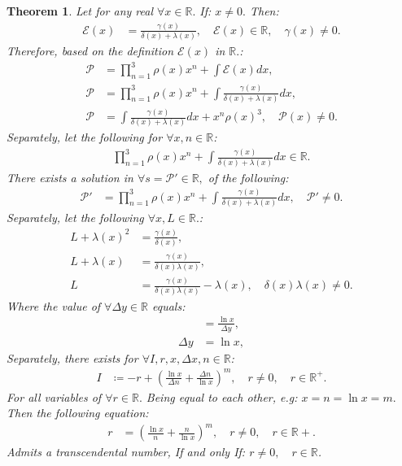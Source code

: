 \documentclass[10pt]{article}
\theoremstyle{plain}
\newtheorem{theorem}{Theorem}[section]
\theoremstyle{definition}
\theoremstyle{remark}
\begin{document}
\begin{theorem}
	Let for any real $\forall x \in \mathbb{R}.$ If: $x \neq 0.$ Then:
	\begin{align*}
		\mathcal{E}(x) &= \frac{\gamma(x)}{\delta(x) + \lambda(x)}, \quad \mathcal{E}(x) \in \mathbb{R}, \quad \gamma(x) \neq 0.
	\end{align*}
	Therefore, based on the definition $\mathcal{E}(x)$ in $\mathbb{R}.$:
	\begin{align*}
		\mathcal{P} &= \prod_{n=1}^{3}\rho(x) x^{n} + \int \mathcal{E}(x) dx,\\
		\mathcal{P} &= \prod_{n=1}^{3}\rho(x) x^{n} + \int \frac{\gamma(x)}{\delta(x) + \lambda(x)} dx,\\
		\mathcal{P} &= \int \frac{\gamma(x)}{\delta(x) + \lambda(x)} dx + x^{n} \rho(x)^{3}, \quad \mathcal{P}(x) \neq 0.
	\end{align*}
	Separately, let the following for $\forall x, n \in \mathbb{R}$:
	\begin{align*}
		\prod_{n=1}^{3}\rho(x) x^{n} + \int \frac{\gamma(x)}{\delta(x) + \lambda(x)} dx \in \mathbb{R}.
	\end{align*}
	There exists a solution in $\forall s = \mathcal{P}' \in \mathbb{R},$ of the following:
	\begin{align*}
		\mathcal{P}' &= \prod_{n=1}^{3}\rho(x) x^{n} + \int \frac{\gamma(x)}{\delta(x) + \lambda(x)} dx, \quad \mathcal{P}' \neq 0.
	\end{align*}
	Separately, let the following $\forall x, L \in \mathbb{R}.$:
	\begin{align*}
		L + \lambda(x)^{2} &= \frac{\gamma(x)}{\delta(x)},\\
	 	L + \lambda(x) &= \frac{\gamma(x)}{\delta(x)  \lambda(x) },\\
	 	L &= \frac{\gamma(x)}{\delta(x)  \lambda(x) } - \lambda(x), \quad \delta(x)\lambda(x) \neq 0.
	\end{align*}
	Where the value of $\forall \Delta y \in \mathbb{R}$ equals:
	\begin{align*}
		&= \frac{\ln x}{\Delta y},\\
		\Delta y &= \ln x,
	\end{align*}
	Separately, there exists for $\forall I, r, x, \Delta x, n \in \mathbb{R}$:
	\begin{align*}
		I &\coloneq -r + ( \frac{\ln x}{\Delta n} + \frac{\Delta n}{\ln x})^m, \quad r \neq 0, \quad r \in \mathbb{R}^{+}.
	\end{align*}
	For all variables of $\forall r \in \mathbb{R}.$ Being equal to each other, e.g: $x = n = \ln x = m.$ Then the following equation:
	\begin{align*}
		r &= ( \frac{\ln x}{n} + \frac{n}{\ln x})^m, \quad r \neq 0, \quad r \in \mathbb{R}{+}.
	\end{align*}
	Admits a transcendental number, If and only If: $r \neq 0, \quad r \in \mathbb{R}$.
\end{theorem}
\end{document}
